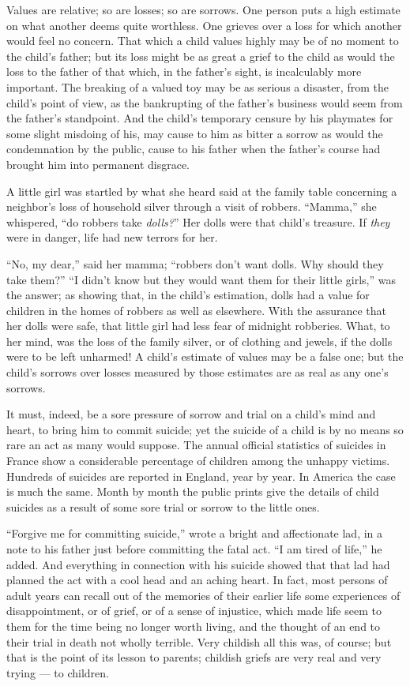\documentclass[
]{book}
\begin{document}
Values are relative; so are losses; so are sorrows. One person puts a high estimate on what another deems quite worthless. One grieves over a loss for which another would feel no concern. That which a child values highly may be of no moment to the child's father; but its loss might be as great a grief to the child as would the loss to the father of that which, in the father's sight, is incalculably more important. The breaking of a valued toy may be as serious a disaster, from the child's point of view, as the bankrupting of the father's business would seem from the father's standpoint. And the child's temporary censure by his playmates for some slight misdoing of his, may cause to him as bitter a sorrow as would the condemnation by the public, cause to his father when the father's course had brought him into permanent disgrace.

A little girl was startled by what she heard said at the family table concerning a neighbor's loss of household silver through a visit of robbers. ``Mamma,'' she whispered, ``do robbers take \emph{dolls?}'' Her dolls were that child's treasure. If \emph{they} were in danger, life had new terrors for her.

``No, my dear,'' said her mamma; ``robbers don't want dolls. Why should they take them?'' ``I didn't know but they would want them for their little girls,'' was the answer; as showing that, in the child's estimation, dolls had a value for children in the homes of robbers as well as elsewhere. With the assurance that her dolls were safe, that little girl had less fear of midnight robberies. What, to her mind, was the loss of the family silver, or of clothing and jewels, if the dolls were to be left unharmed! A child's estimate of values may be a false one; but the child's sorrows over losses measured by those estimates are as real as any one's sorrows.

It must, indeed, be a sore pressure of sorrow and trial on a child's mind and heart, to bring him to commit suicide; yet the suicide of a child is by no means so rare an act as many would suppose. The annual official statistics of suicides in France show a considerable percentage of children among the unhappy victims. Hundreds of suicides are reported in England, year by year. In America the case is much the same. Month by month the public prints give the details of child suicides as a result of some sore trial or sorrow to the little ones.

``Forgive me for committing suicide,'' wrote a bright and affectionate lad, in a note to his father just before committing the fatal act. ``I am tired of life,'' he added. And everything in connection with his suicide showed that that lad had planned the act with a cool head and an aching heart. In fact, most persons of adult years can recall out of the memories of their earlier life some experiences of disappointment, or of grief, or of a sense of injustice, which made life seem to them for the time being no longer worth living, and the thought of an end to their trial in death not wholly terrible. Very childish all this was, of course; but that is the point of its lesson to parents; childish griefs are very real and very trying --- to children.
\end{document}
